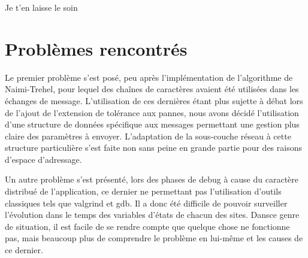 Je t'en laisse le soin

\section{Problèmes rencontrés}

Le premier problème s'est posé, peu après l'implémentation de l'algorithme de Naimi-Trehel, pour
lequel des chaînes de caractères avaient été utilisées dans les échanges de message. L'utilisation
de ces dernières étant plus sujette à débat lors de l'ajout de l'extension de tolérance aux pannes,
nous avons décidé l'utilisation d'une structure de données spécifique aux messages permettant une
gestion plus claire des paramètres à envoyer. L'adaptation de la sous-couche réseau à cette
structure particulière s'est faite non sans peine en grande partie pour des raisons d'espace
d'adressage.

Un autre problème s'est présenté, lors des phases de debug à cause du caractère distribué de
l'application, ce dernier ne permettant pas l'utilisation d'outils classiques tels que valgrind et
gdb. Il a donc été difficile de pouvoir surveiller l'évolution dans le temps des variables d'états
de chacun des sites. Dansce genre de situation, il est facile de se rendre compte que quelque chose
ne fonctionne pas, mais beaucoup plus de comprendre le problème en lui-même et les causes de ce
dernier. 
